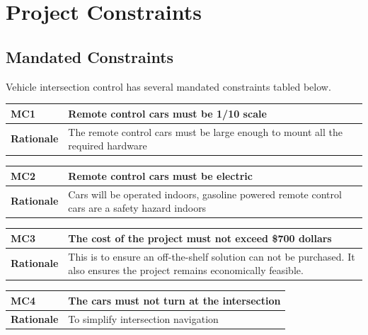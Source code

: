 \documentclass [11pt]{article}
\begin{document}
\section{\textbf{Project Constraints}}


\subsection{Mandated Constraints}
Vehicle intersection control has several mandated constraints tabled below. 
\begin{longtable}{| p{ } | p{ } | }\hline 
\rowcolor{tableCell}\textbf{MC1} & \textbf{Remote control cars must be 1/10 scale} \\ \hline
\textbf{Rationale} & The remote control cars must be large enough to mount all the required hardware\\ \hline 

\end{longtable}

\begin{longtable}{| p{ } | p{ } | }\hline 

\rowcolor{tableCell}\textbf{MC2}& \textbf{Remote control cars must be electric}\\ \hline 
\textbf{Rationale} & Cars will be operated indoors, gasoline powered remote control cars are a safety hazard indoors\\ \hline 

\end{longtable}

\begin{longtable}{| p{ } | p{ } | }\hline 
\rowcolor{tableCell}\textbf{MC3} & \textbf{The cost of the project must not exceed \$700 dollars} \\ \hline
\textbf{Rationale} & This is to ensure an off-the-shelf solution can not be purchased. It also ensures the project remains economically feasible. \\ \hline
\end{longtable}

\begin{longtable}{| p{ } | p{ } | }\hline 
\rowcolor{tableCell}\textbf{MC4} & \textbf{The cars must not turn at the intersection} \\ \hline
\textbf{Rationale} & To simplify intersection navigation \\ \hline


\end{longtable}
\end{document}
